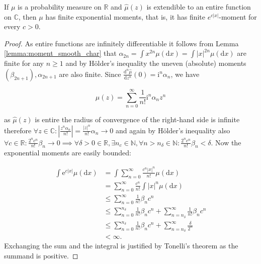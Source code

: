\documentclass[a4paper,11pt]{article}
\begin{document}
\begin{lemma} \label{lem:entire_char_mom}
    If $\mu$ is a probability measure on $\mathbb{R}$ and $\widehat{\mu}(z)$ is extendible to an entire
    function on $\mathbb{C}$, then $\mu$ has finite exponential moments, that is, it has finite $e^{c|x|}$-moment for every $c>0$.
\end{lemma}

\begin{proof}
    As entire functions are infinitely differentiable it follows from Lemma \ref{lemma:moment_smooth_char} that $\alpha_{2n}=\int x^{2n} \mu(\mathrm{d} x) =\int |x|^{2n} \mu(\mathrm{d} x) $ are finite for any $n \geq 1$ and by H\"{o}lder's inequality the uneven (absolute) moments $(\beta_{2n+1}),\alpha_{2n+1}$ are also finite.
    Since $\frac{\mathrm{d}^{n} \widehat{\mu}}{\mathrm{d} z^{n}}(0)=\mathrm{i}^{n} \alpha_{n}$, we have

    $$
        \widehat{\mu}(z)=\sum_{n=0}^{\infty} \frac{1}{n !} \mathrm{i}^{n} \alpha_{n} z^{n}
    $$

    as $\widehat{\mu}(z)$ is entire the radius of convergence of the right-hand side is infinite therefore $ \forall z \in \mathbb{C}: \left| \frac{z^{n} \alpha_{n}}{n!} \right| = \frac{|z|^{n} }{n!} \alpha_{n} \rightarrow 0$ and again by H\"{o}lder's inequality also  $\forall c \in \mathbb{R}:\frac{2^{n}c^{n}}{n!} \beta_{n}\rightarrow 0 \implies \forall \delta>0 \in \mathbb{R}, \exists n _{c} \in  \mathbb{N},  \forall n>n _{\delta} \in \mathbb{N}:\frac{2^{n}c^{n}}{n!} \beta_{n} <\delta$. Now the exponential moments are easily bounded:

    \begin{align}
        \int \mathrm{e}^{c|x|} \mu(\mathrm{d} x) & =  \int \sum_{n=0}^{\infty} \frac{c^{n} |x|^{n} }{n!} \mu(\mathrm{d} x)      \\
                                                 & =  \sum_{n=0}^{\infty}\frac{c^{n} }{n!} \int |x|^{n} \mu(\mathrm{d} x)       \\
                                                 & \le \sum_{n=0}^{\infty} \frac{1}{n !} \beta_{n} c^{n}                        \\
                                                 &
        \le\sum_{n=0}^{n _{\delta}} \frac{1}{n !} \beta_{n} c^{n} + \sum_{n=n _{\delta}}^{\infty} \frac{1}{n !} \beta_{n} c^{n} \\
                                                 &
        \le\sum_{n=0}^{n _{\delta}} \frac{1}{n !} \beta_{n} c^{n} + \sum_{n=n _{\delta}}^{\infty} \frac{\delta}{2^{n}}          \\
                                                 & < \infty.
    \end{align}
    Exchanging the sum and the integral is justified by Tonelli's theorem as the summand is positive.
\end{proof}
\end{document}
